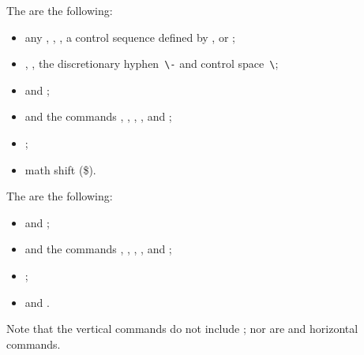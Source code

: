 \documentclass[twoside,letterpaper,openright]{rapport3}
\begin{document}
The  are the following:
\label{h:com:list}
\begin{itemize}
\item any , , , 
a control sequence defined by , or ;
\item {}, , the discretionary
hyphen~\verb|\-| and control space~\verb|\|;
\item {} and ;
\item {} and the
 commands
, , , , and ;
\item {};
\item math shift (\n\$).
\end{itemize}

The  are the following:
\label{v:com:list}
\begin{itemize}
\item {} and ;
\item {} and the  commands
 , , , , and ;
\item {};
\item {} and .
\end{itemize}
Note that the vertical commands do not include ;
nor are  and  horizontal commands.
\end{document}
